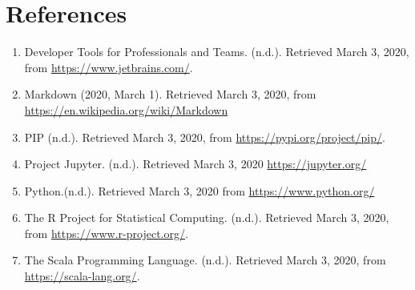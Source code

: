 \documentclass[pdftex,12pt]{artikel3}
\begin{document}
\newpage

\section{References}

\begin{enumerate}

\item
Developer Tools for Professionals and Teams. (n.d.). Retrieved March 3, 2020, from \url{https://www.jetbrains.com/}.

\item
Markdown (2020, March 1). Retrieved March 3, 2020, from 
\url{https://en.wikipedia.org/wiki/Markdown}


\item
PIP (n.d.). Retrieved March 3, 2020, from 
\url{https://pypi.org/project/pip/}.

\item Project Jupyter. (n.d.). Retrieved March 3, 2020 \url{https://jupyter.org/}

\item
Python.(n.d.). Retrieved March 3, 2020 from \url{https://www.python.org/}

\item
The R Project for Statistical Computing. (n.d.). Retrieved March 3, 2020, from
\url{https://www.r-project.org/}.

\item
The Scala Programming Language. (n.d.). Retrieved March 3, 2020, from
\url{https://scala-lang.org/}.

\end{enumerate}

\newpage

\printindex
\end{document}
